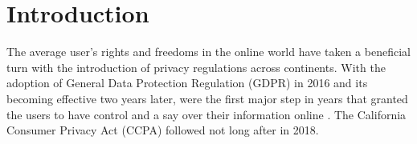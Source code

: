 \chapter{Introduction}




The average user's rights and freedoms in the online world have taken a beneficial turn with the introduction of privacy regulations across continents.
With the adoption of General Data Protection Regulation (GDPR) in 2016 and its becoming effective two years later, were the first major step in years that granted the users to have control and a say over their information online \cite{gdprhistory}. 
The California Consumer Privacy Act (CCPA) followed not long after in 2018. 

